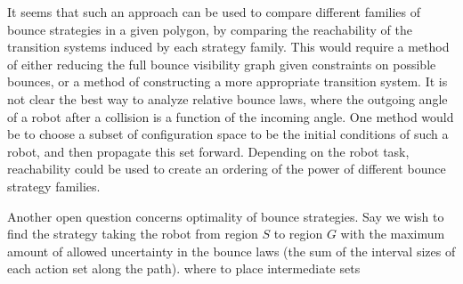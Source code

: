 \documentclass[]{styles/svproc}  %
\begin{document}
It seems that such an approach can be used to compare different families of
bounce strategies in a given polygon, by comparing the reachability of the
transition systems induced by each strategy family. This would require a
method of either reducing the full bounce visibility graph given constraints on
possible bounces, or a method of constructing a more appropriate transition
system. It is not clear the best way to analyze relative bounce laws, where the
outgoing angle of a robot after a collision is a function of the incoming angle.
One method would be to choose a subset of configuration space to be the initial
conditions of such a robot, and then propagate this set forward. Depending on
the robot task, reachability could be used to create an ordering of the power of
different bounce strategy families.

Another open question concerns optimality of bounce strategies. Say we wish to
find the strategy taking the robot from region $S$ to region $G$ with the
maximum amount of allowed uncertainty in the bounce laws (the sum of the
interval sizes of each action set along the path). {\color{red} where to place
intermediate sets}

%
%



%
%
%
%
%
\end{document}
